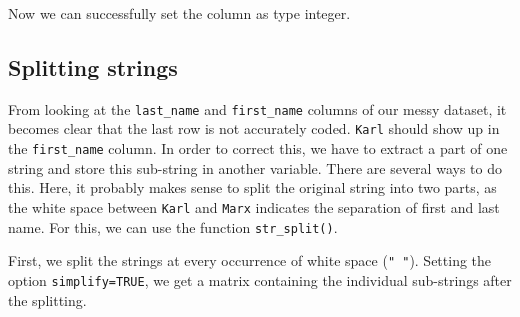 \documentclass[
  12pt,
]{style/krantz}
\newenvironment{Shaded}{\begin{snugshade}}{\end{snugshade}}
\newcommand{\AttributeTok}[1]{\textcolor[rgb]{0.77,0.63,0.00}{#1}}
\newcommand{\ConstantTok}[1]{\textcolor[rgb]{0.00,0.00,0.00}{#1}}
\newcommand{\FunctionTok}[1]{\textcolor[rgb]{0.00,0.00,0.00}{#1}}
\newcommand{\NormalTok}[1]{#1}
\newcommand{\OtherTok}[1]{\textcolor[rgb]{0.56,0.35,0.01}{#1}}
\newcommand{\SpecialCharTok}[1]{\textcolor[rgb]{0.00,0.00,0.00}{#1}}
\newcommand{\StringTok}[1]{\textcolor[rgb]{0.31,0.60,0.02}{#1}}
\begin{document}
\begin{Shaded}
\end{Shaded}

Now we can successfully set the column as type integer.

\begin{Shaded}
\end{Shaded}

\hypertarget{splitting-strings}{%
\subsection{Splitting strings}\label{splitting-strings}}

From looking at the \texttt{last\_name} and \texttt{first\_name} columns of our messy dataset, it becomes clear that the last row is not accurately coded. \texttt{Karl} should show up in the \texttt{first\_name} column. In order to correct this, we have to extract a part of one string and store this sub-string in another variable. There are several ways to do this. Here, it probably makes sense to split the original string into two parts, as the white space between \texttt{Karl} and \texttt{Marx} indicates the separation of first and last name. For this, we can use the function \texttt{str\_split()}.

First, we split the strings at every occurrence of white space (\texttt{"\ "}). Setting the option \texttt{simplify=TRUE}, we get a matrix containing the individual sub-strings after the splitting.

\begin{Shaded}
\end{Shaded}
\end{document}
